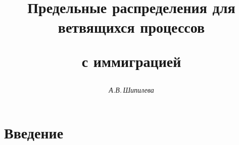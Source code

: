 










\setcounter{page}{77}















\author{\it А.В.\,Шипилева}




\title{Предельные распределения для ветвящихся процессов


с иммиграцией}






\date{}







\pagestyle{plain} %







\maketitle


\label{begin}








\section{Введение}






